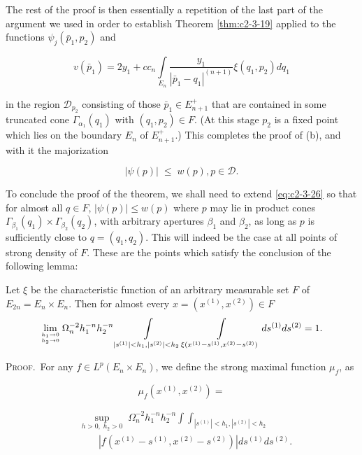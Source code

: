 The rest of the proof is then essentially a repetition of the last part of the argument we used in order to establish Theorem \ref{thm:c2-3-19} applied to the functions $\psi_{j}(\bar{p}_{1}, p_{2})$ and

\[
v(\bar{p}_{1})=2y_{1}+cc_{n}\int\limits_{E_{n}}\frac{y_{1}}{|\bar{p}_{1}-q_{1}|^{(n+1)}}\xi(q_{1},p_{2})dq_{1}
\]

in the region $\mathcal{D}_{p_2}$ consisting of those $\bar{p}_1 \in E_{n+1}^+$ that are contained in some truncated cone $\Gamma_{\alpha_1}(q_1)$ with $(q_1, p_2) \in F$. (At this stage $p_2$ is a fixed point which lies on the boundary $E_n$ of $E_{n+1}^+$.) This completes the proof of (b), and with it the majorization

\begin{equation}\label{eq:c2-3-26}
|\psi(p)|\;\leq\;w(p),p\in\mathcal{D}.
\end{equation}

To conclude the proof of the theorem, we shall need to extend \eqref{eq:c2-3-26} so that for almost all $q \in F$, $|\psi(p)| \leq w(p)$ where $p$ may lie in product cones $\Gamma_{\beta_1}(q_1) \times \Gamma_{\beta_2}(q_2)$, with arbitrary apertures $\beta_1$ and $\beta_2$, as long as $p$ is sufficiently close to $q = (q_1, q_2)$. This will indeed be the case at all points of strong density of $F$. These are the points which satisfy the conclusion of the following lemma:

\begin{lemma}
\label{lem:c2-3-27}
Let $\xi$ be the characteristic function of an arbitrary measurable set $F$ of $E_{2n} = E_n \times E_n$. Then for almost every $x = (x^{(1)}, x^{(2)}) \in F$
\[
\lim_{h_{1}\to0\atop h_{2}\to0}\Omega_{n}^{-2}h_{1}^{-n}h_{2}^{-n}\int\limits_{|s^{(1)}|<h_{1},|s^{(2)}|<h_{2}}\int\limits_{\xi(x^{(1)}-s^{(1)},x^{(2)}-s^{(2)})}d s^{(1)}d s^{(2)}=1.
\]

\end{lemma}

\textsc{Proof.}\ For any $f \in L^{p}(E_{n} \times E_{n})$, we define the strong maximal function $\mu_{f}$, as

\[
\mu_{f}(x^{(1)},x^{(2)})=
\]

\[
\begin{aligned}&\sup_{h>0,\;h_{2}>0}\;\Omega_{n}^{-2}h_{1}^{-n}h_{2}^{-n}\int\int_{|s^{(1)}|<h_{1},|s^{(2)}|<h_{2}}\\&\qquad|f(x^{(1)}-s^{(1)},x^{(2)}-s^{(2)})|d s^{(1)}d s^{(2)}.\end{aligned}
\]

